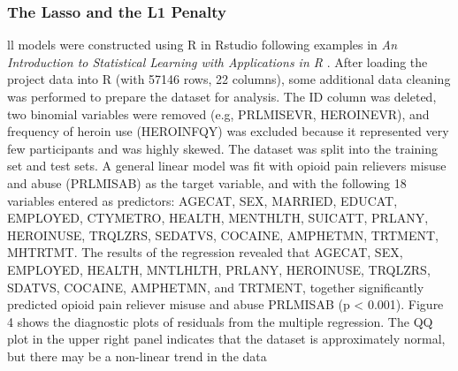 \documentclass[sigconf]{acmart}
\begin{document}


\subsubsection{The Lasso and the L1 Penalty} 

ll models were constructed using R in Rstudio following examples in 
\emph{An Introduction to Statistical Learning with Applications in R} 
\cite{statlearn13}. After loading the project data into R (with 57146 rows, 
22 columns), some additional data cleaning was performed to prepare the 
dataset for analysis. The ID column was deleted, two binomial variables were 
removed (e.g, PRLMISEVR, HEROINEVR), and frequency of heroin use (HEROINFQY) 
was excluded because it represented very few participants and was highly skewed. 
The dataset was split into the training set and test sets. A general linear 
model was fit with opioid pain relievers misuse and abuse (PRLMISAB) as the 
target variable, and with the following 18 variables entered as predictors: 
AGECAT, SEX, MARRIED, EDUCAT, EMPLOYED, CTYMETRO, HEALTH, MENTHLTH, SUICATT,
PRLANY, HEROINUSE, TRQLZRS, SEDATVS, COCAINE, AMPHETMN, TRTMENT, MHTRTMT. 
The results of the regression revealed that AGECAT, SEX, EMPLOYED, HEALTH, 
MNTLHLTH, PRLANY, HEROINUSE, TRQLZRS, SDATVS, COCAINE, AMPHETMN, and TRTMENT, 
together significantly predicted opioid pain reliever misuse and abuse 
PRLMISAB (p < 0.001). Figure 4 shows the diagnostic plots of residuals from 
the multiple regression. The QQ plot in the upper right panel indicates that 
the dataset is approximately normal, but there may be a non-linear trend 
in the data
\end{document}
